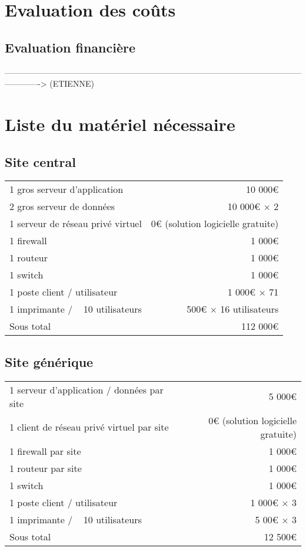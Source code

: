 \section{Evaluation des coûts}

    \subsection{Evaluation financière}

-------------------------------------------------------------------------------------------------------------------------> (ETIENNE)

\section{Liste du matériel nécessaire}
    \subsection{Site central}
        \begin{tabular*}{\textwidth}{ l @{\extracolsep{\fill}} r }
1 gros serveur d'application & 10 000€ \\
2 gros serveur de données & 10 000€ $\times$ 2 \\
1 serveur de réseau privé virtuel & 0€ (solution logicielle gratuite)\\
            1 firewall & 1 000€ \\
1 routeur & 1 000€ \\
1 switch & 1 000€ \\
1 poste client / utilisateur & 1 000€ $\times$ 71\\
1 imprimante / ~ 10 utilisateurs & 500€ $\times$ 16 utilisateurs\\ \hline
Sous total & 112 000€
        \end{tabular*}
        
    \subsection{Site générique}
        \begin{tabular*}{\textwidth}{ l @{\extracolsep{\fill}} r }
1 serveur d'application / données par site & 5 000€ \\
1 client de réseau privé virtuel par site & 0€ (solution logicielle gratuite)\\
            1 firewall par site & 1 000€ \\
1 routeur par site & 1 000€ \\
1 switch & 1 000€ \\
1 poste client / utilisateur & 1 000€ $\times$ 3 \\
1 imprimante / ~ 10 utilisateurs & 5 00€ $\times$ 3 \\ \hline
Sous total & 12 500€
        \end{tabular*}

